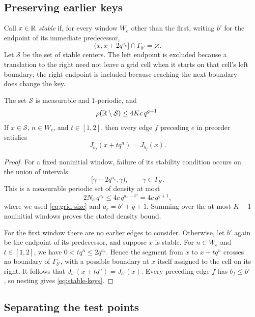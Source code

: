 

\subsection*{Preserving earlier keys}

Call $x\in\mathbb R$ \emph{stable} if, for every window $W_e$ other than the
first, writing $b'$ for the endpoint of its immediate predecessor,
\[
 (x,x+2q^{a_e}]\cap\Gamma_{b'}=\varnothing.
\]
Let $\mathcal S$ be the set of stable centers.  The left endpoint is
excluded because a translation to the right need not leave a grid cell
when it starts on that cell's left boundary; the right endpoint is
included because reaching the next boundary does change the key.

\begin{lemma}\label{lem:stability}
The set $\mathcal S$ is measurable and $1$-periodic, and
\[
 \rho(\mathbb R\setminus\mathcal S)\le4Kc\,q^{g+1}.
\]
If $x\in\mathcal S$, $n\in W_e$, and $t\in[1,2]$, then every edge $f$
preceding $e$ in preorder satisfies
\begin{equation}\label{eq:stable-keys}
 J_{b_f}(x+tq^n)=J_{b_f}(x).
\end{equation}
\end{lemma}

\begin{proof}
For a fixed noninitial window, failure of its stability condition occurs
on the union of intervals
\[
 [\gamma-2q^{a_e},\gamma),\qquad \gamma\in\Gamma_{b'}.
\]
This is a measurable periodic set of density at most
\[
 2N_{b'}q^{a_e}
 \le4c\,q^{a_e-b'}
 =4c\,q^{g+1},
\]
where we used \eqref{eq:grid-size} and $a_e=b'+g+1$.  Summing over the
at most $K-1$ noninitial windows proves the stated density bound.

For the first window there are no earlier edges to consider.  Otherwise,
let $b'$ again be the endpoint of its predecessor, and suppose $x$ is
stable.  For $n\in W_e$ and $t\in[1,2]$, we have
$0<tq^n\le2q^{a_e}$.  Hence the segment from $x$ to $x+tq^n$ crosses
no boundary of $\Gamma_{b'}$, with a possible boundary at $x$ itself
assigned to the cell on its right.  It follows that
$J_{b'}(x+tq^n)=J_{b'}(x)$.  Every preceding edge $f$ has $b_f\le b'$,
so nesting gives \eqref{eq:stable-keys}.
\end{proof}

\subsection*{Separating the test points}


